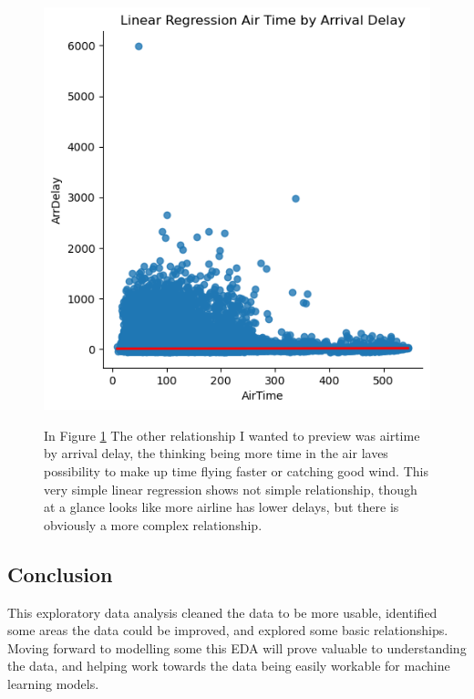 \documentclass[a4paper,12pt]{article}
\begin{document}
\begin{figure}
    \centering
    \includegraphics*[]{../../img/airtime_by_delay.png}
    \caption[]{}
    \label{fig:lm_airtimebydelay}
    In Figure \ref{fig:lm_airtimebydelay} The other relationship I wanted to preview was airtime by arrival delay, the thinking being more time in the air laves possibility 
    to make up time flying faster or catching good wind. This very simple linear regression shows not simple relationship, though at a glance looks like more airline has lower delays, but there is obviously a more complex relationship.
\end{figure}

\break
\subsection{Conclusion}

This exploratory data analysis cleaned the data to be more usable, identified some areas the data could be improved, and explored some basic relationships.
Moving forward to modelling some this EDA will prove valuable to understanding the data, and helping work towards the data being easily workable for machine learning models.
\end{document}
